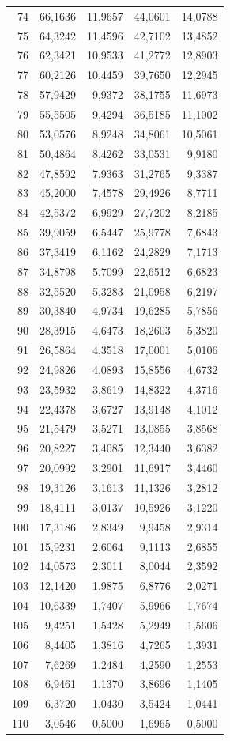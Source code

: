 \begin{small}
\begin{longtable}{rrrrr}
74 & 66,1636 & 11,9657 & 44,0601 & 14,0788 \\
75 & 64,3242 & 11,4596 & 42,7102 & 13,4852 \\
76 & 62,3421 & 10,9533 & 41,2772 & 12,8903 \\
77 & 60,2126 & 10,4459 & 39,7650 & 12,2945 \\
78 & 57,9429 & 9,9372 & 38,1755 & 11,6973 \\
79 & 55,5505 & 9,4294 & 36,5185 & 11,1002 \\
80 & 53,0576 & 8,9248 & 34,8061 & 10,5061 \\
81 & 50,4864 & 8,4262 & 33,0531 & 9,9180 \\
82 & 47,8592 & 7,9363 & 31,2765 & 9,3387 \\
83 & 45,2000 & 7,4578 & 29,4926 & 8,7711 \\
84 & 42,5372 & 6,9929 & 27,7202 & 8,2185 \\
85 & 39,9059 & 6,5447 & 25,9778 & 7,6843 \\
86 & 37,3419 & 6,1162 & 24,2829 & 7,1713 \\
87 & 34,8798 & 5,7099 & 22,6512 & 6,6823 \\
88 & 32,5520 & 5,3283 & 21,0958 & 6,2197 \\
89 & 30,3840 & 4,9734 & 19,6285 & 5,7856 \\
90 & 28,3915 & 4,6473 & 18,2603 & 5,3820 \\
91 & 26,5864 & 4,3518 & 17,0001 & 5,0106 \\
92 & 24,9826 & 4,0893 & 15,8556 & 4,6732 \\
93 & 23,5932 & 3,8619 & 14,8322 & 4,3716 \\
94 & 22,4378 & 3,6727 & 13,9148 & 4,1012 \\
95 & 21,5479 & 3,5271 & 13,0855 & 3,8568 \\
96 & 20,8227 & 3,4085 & 12,3440 & 3,6382 \\
97 & 20,0992 & 3,2901 & 11,6917 & 3,4460 \\
98 & 19,3126 & 3,1613 & 11,1326 & 3,2812 \\
99 & 18,4111 & 3,0137 & 10,5926 & 3,1220 \\
100 & 17,3186 & 2,8349 & 9,9458 & 2,9314 \\
101 & 15,9231 & 2,6064 & 9,1113 & 2,6855 \\
102 & 14,0573 & 2,3011 & 8,0044 & 2,3592 \\
103 & 12,1420 & 1,9875 & 6,8776 & 2,0271 \\
104 & 10,6339 & 1,7407 & 5,9966 & 1,7674 \\
105 & 9,4251 & 1,5428 & 5,2949 & 1,5606 \\
106 & 8,4405 & 1,3816 & 4,7265 & 1,3931 \\
107 & 7,6269 & 1,2484 & 4,2590 & 1,2553 \\
108 & 6,9461 & 1,1370 & 3,8696 & 1,1405 \\
109 & 6,3720 & 1,0430 & 3,5424 & 1,0441 \\
110 & 3,0546 & 0,5000 & 1,6965 & 0,5000 \\
\end{longtable}
\end{small}
